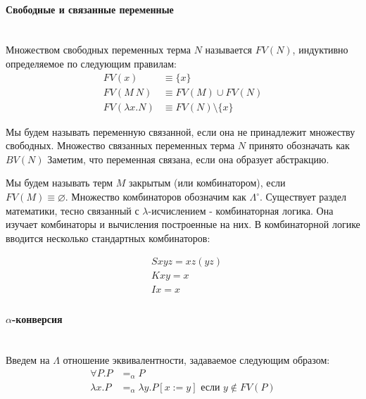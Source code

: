 \documentclass[lambda.tex]{subfiles}
\begin{document}
\paragraph{Свободные и связанные переменные} %
\label{par:free_and_bound} ~\\
Множеством свободных переменных терма $N$ называется $FV(N)$, индуктивно определяемое по следующим правилам:
\begin{align*}
FV(x) &\equiv \{x\}\\
FV(M\ N) &\equiv FV(M)\cup FV(N)\\
FV(\lambda x.N) &\equiv FV(N)\setminus\{x\}
\end{align*}

Мы будем называть переменную связанной, если она не принадлежит множеству свободных. Множество связанных переменных терма $N$ принято обозначать как $BV(N)$ Заметим, что переменная связана, если она образует абстракцию.

Мы будем называть терм $M$ закрытым (или комбинатором), если\\ \(FV(M) \equiv \varnothing\). Множество комбинаторов обозначим как $\Lambda^\circ$. Существует раздел математики, тесно связанный с $\lambda$-исчислением - комбинаторная логика. Она изучает комбинаторы и вычисления построенные на них. В комбинаторной логике вводится несколько стандартных комбинаторов:

\begin{align*}
	&Sxyz = xz(yz)\\
	&Kxy = x\\
    &Ix = x\\
\end{align*}


\paragraph{$\alpha$-конверсия} %
~\\
\label{par:aplha conversion}
Введем на $\Lambda$ отношение эквивалентности, задаваемое следующим образом:
\begin{align*}
\forall P.P &=_\alpha P\\
\lambda x.P &=_\alpha \lambda y.P[x:=y] \text{ если } y \not\in FV(P)
\end{align*}
\end{document}
